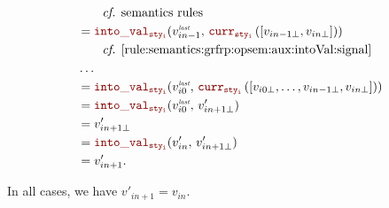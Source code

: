 \begin{skippableproof}
\begin{itemize}
\begin{enumerate}
\begin{align*}
                                   & \qquad \text{\cf semantics rules}                                                                    \\
                                   & = \intoVal{sty_i}{v_{in-1}^{\explast}}{\CurrVal{sty_i}{[v_{in-1\bot}, v_{in\bot}]}}                  \\
                                   & \qquad \text{\cf \Cref{rule:semantics:grfrp:opsem:aux:intoVal:signal}}                               \\
                                   & \dots                                                                                                \\
                                   & = \intoVal{sty_i}{v_{i0}^{\explast}}{\CurrVal{sty_i}{[v_{i0\bot}, \dots, v_{in-1\bot}, v_{in\bot}]}} \\
                                   & = \intoVal{sty_i}{v_{i0}^{\explast}}{v'_{in+1\bot}}                                                  \\
                                   & = v'_{in+1\bot}                                                                                      \\
                                   & = \intoVal{sty_i}{v'_{in}}{v'_{in+1\bot}}                                                            \\
                                   & = v'_{in+1}.
                        \end{align*}
              \end{enumerate}
              In all cases, we have $v'_{in+1} = v_{in}$.


\end{itemize}
\end{skippableproof}
